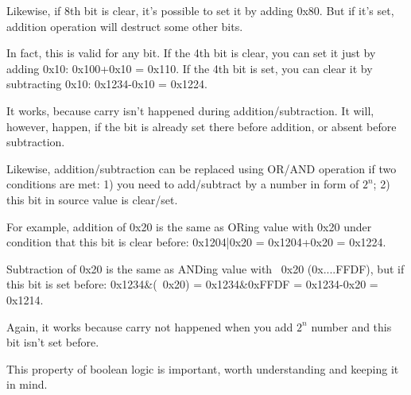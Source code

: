 Likewise, if 8th bit is clear, it's possible to set it by adding 0x80.
But if it's set, addition operation will destruct some other bits.

In fact, this is valid for any bit.
If the 4th bit is clear, you can set it just by adding 0x10: 0x100+0x10 = 0x110.
If the 4th bit is set, you can clear it by subtracting 0x10: 0x1234-0x10 = 0x1224.

It works, because carry isn't happened during addition/subtraction.
It will, however, happen, if the bit is already set there before addition, or absent before subtraction.

Likewise, addition/subtraction can be replaced using OR/AND operation if two conditions are met:
1) you need to add/subtract by a number in form of $2^n$;
2) this bit in source value is clear/set.

For example, addition of 0x20 is the same as ORing value with 0x20 under condition that this bit is clear before:
0x1204|0x20 = 0x1204+0x20 = 0x1224.

Subtraction of 0x20 is the same as ANDing value with ~0x20 (0x....FFDF), but if this bit is set before:
0x1234\&(~0x20) = 0x1234\&0xFFDF = 0x1234-0x20 = 0x1214.

Again, it works because carry not happened when you add $2^n$ number and this bit isn't set before.

This property of boolean logic is important, worth understanding and keeping it in mind.

